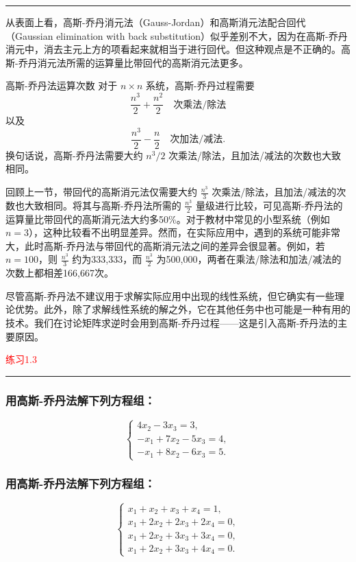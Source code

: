 \color{red}\rule{\textwidth}{0.4pt}\color{black}


从表面上看，高斯-乔丹消元法（Gauss-Jordan）和高斯消元法配合回代（Gaussian elimination with back substitution）似乎差别不大，因为在高斯-乔丹消元中，消去主元上方的项看起来就相当于进行回代。但这种观点是不正确的。高斯-乔丹消元法所需的运算量比带回代的高斯消元法更多。

\begin{bluebox}{高斯-乔丹法运算次数}
	对于 \( n \times n \) 系统，高斯-乔丹过程需要
	\[
	\frac{n^3}{2} + \frac{n^2}{2} \quad \text{次乘法/除法}
	\]
	以及
	\[
	\frac{n^3}{2} - \frac{n}{2} \quad \text{次加法/减法}.
	\]
	换句话说，高斯-乔丹法需要大约 \( n^3/2 \) 次乘法/除法，且加法/减法的次数也大致相同。
\end{bluebox}

回顾上一节，带回代的高斯消元法仅需要大约 \( \frac{n^3}{3} \) 次乘法/除法，且加法/减法的次数也大致相同。将其与高斯-乔丹法所需的 \( \frac{n^3}{2} \) 量级进行比较，可见高斯-乔丹法的运算量比带回代的高斯消元法大约多50\%。对于教材中常见的小型系统（例如 \( n = 3 \)），这种比较看不出明显差异。然而，在实际应用中，遇到的系统可能非常大，此时高斯-乔丹法与带回代的高斯消元法之间的差异会很显著。例如，若 \( n = 100 \)，则 \( \frac{n^3}{3} \) 约为333,333，而 \( \frac{n^3}{2} \) 为500,000，两者在乘法/除法和加法/减法的次数上都相差166,667次。

尽管高斯-乔丹法不建议用于求解实际应用中出现的线性系统，但它确实有一些理论优势。此外，除了求解线性系统的解之外，它在其他任务中也可能是一种有用的技术。我们在讨论矩阵求逆时会用到高斯-乔丹过程——这是引入高斯-乔丹法的主要原因。

\textcolor{red}{练习1.3}
\color{red}\rule{\textwidth}{0.4pt}\color{black}

\subsubsection{用高斯-乔丹法解下列方程组：}
\[
\begin{cases}
	4x_2 - 3x_3 = 3, \\
	-x_1 + 7x_2 - 5x_3 = 4, \\
	-x_1 + 8x_2 - 6x_3 = 5.
\end{cases}
\]

\subsubsection{用高斯-乔丹法解下列方程组：}
\[
\begin{cases}
	x_1 + x_2 + x_3 + x_4 = 1, \\
	x_1 + 2x_2 + 2x_3 + 2x_4 = 0, \\
	x_1 + 2x_2 + 3x_3 + 3x_4 = 0, \\
	x_1 + 2x_2 + 3x_3 + 4x_4 = 0.
\end{cases}
\]

